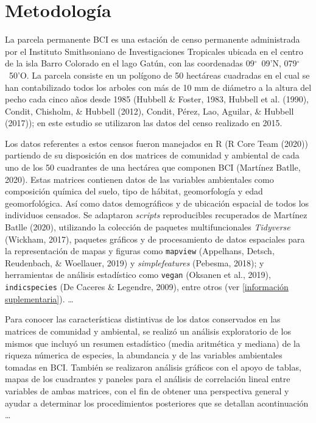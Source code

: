 \documentclass[11pt,]{article}
\begin{document}
\section{Metodología}\label{metodologuxeda}

La parcela permanente BCI es una estación de censo permanente
administrada por el Instituto Smithsoniano de Investigaciones Tropicales
ubicada en el centro de la isla Barro Colorado en el lago Gatún, con las
coordenadas 09\(^\circ\)~09'N, 079\(^\circ\)~50'O. La parcela consiste
en un polígono de 50 hectáreas cuadradas en el cual se han contabilizado
todos los arboles con más de 10 mm de diámetro a la altura del pecho
cada cinco años desde 1985 (Hubbell \& Foster, 1983, Hubbell et al.
(1990), Condit, Chisholm, \& Hubbell (2012), Condit, Pérez, Lao,
Aguilar, \& Hubbell (2017)); en este estudio se utilizaron las datos del
censo realizado en 2015.

Los datos referentes a estos censos fueron manejados en R (R Core Team
(2020)) partiendo de su disposición en dos matrices de comunidad y
ambiental de cada uno de los 50 cuadrantes de una hectárea que componen
BCI (Martínez Batlle, 2020). Estas matrices contienen datos de las
variables ambientales como composición química del suelo, tipo de
hábitat, geomorfología y edad geomorfológica. Así como datos
demográficos y de ubicación espacial de todos los individuos censados.
Se adaptaron \emph{scripts} reproducibles recuperados de Martínez Batlle
(2020), utilizando la colección de paquetes multifuncionales
\emph{Tidyverse} (Wickham, 2017), paquetes gráficos y de procesamiento
de datos espaciales para la representación de mapas y figuras como
\texttt{mapview} (Appelhans, Detsch, Reudenbach, \& Woellauer, 2019) y
\emph{simplefeatures} (Pebesma, 2018); y herramientas de análisis
estadístico como \texttt{vegan} (Oksanen et al., 2019),
\texttt{indicspecies} (De Caceres \& Legendre, 2009), entre otros (ver
\ref{información suplementaria}). \dots

Para conocer las características distintivas de los datos conservados en
las matrices de comunidad y ambiental, se realizó un análisis
exploratorio de los mismos que incluyó un resumen estadístico (media
aritmética y mediana) de la riqueza númerica de especies, la abundancia
y de las variables ambientales tomadas en BCI. También se realizaron
análisis gráficos con el apoyo de tablas, mapas de los cuadrantes y
paneles para el análisis de correlación lineal entre variables de ambas
matrices, con el fin de obtener una perspectiva general y ayudar a
determinar los procedimientos posteriores que se detallan acontinuación
\dots
\end{document}
